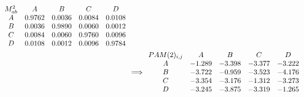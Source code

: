 \documentclass{article}
\begin{document}
\begin{flushleft}
\begin{align*}
    \begin{array}{c c c c c}
        M^2_{ab} & A & B & C & D \\
        A & 0.9762 & 0.0036 & 0.0084 & 0.0108 \\
        B & 0.0036 & 0.9890 & 0.0060 & 0.0012 \\
        C & 0.0084 & 0.0060 & 0.9760 & 0.0096 \\
        D & 0.0108 & 0.0012 & 0.0096 & 0.9784 \\
    \end{array} \\
    & \Longrightarrow
    \begin{array}{c c c c c}
        PAM(2)_{i,j} & A & B & C & D \\
        A & -1.289 & -3.398 & -3.377 & -3.222 \\
        B & -3.722 & -0.959 & -3.523 & -4.176 \\
        C & -3.354 & -3.176 & -1.312 & -3.273 \\
        D & -3.245 & -3.875 & -3.319 & -1.265
    \end{array}
\end{align*}
\end{flushleft}
\end{document}
